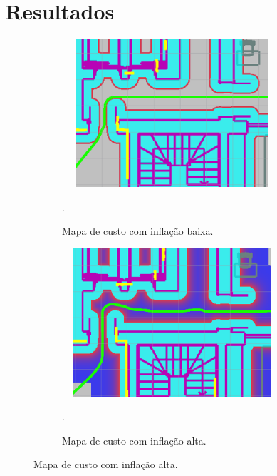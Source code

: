 \documentclass[repeatfields,xlists,xpacks,oneside,yearsonly]{ufrgscca}
\begin{document}
\chapter{Resultados}
\label{resultados}

\begin{figure}[h]
    \begin{subfigure}{0.5\linewidth}
    {
        \centering
        \caption{Mapa de custo com inflação baixa.}
        \label{fig:inflation_low}
        \includegraphics[width=0.9\textwidth, height=5.5cm]{costmap_not_inflated.png}\\
    }
    {.}
    \end{subfigure}
    \begin{subfigure}{0.5\linewidth}
    {
        \centering
        \caption{Mapa de custo com inflação alta.}
        \label{fig:inflation_high}
        \includegraphics[width=0.9\textwidth, height=5.5cm]{costmap_inflated.png}\\
    }
    {.}
    \end{subfigure}
\end{figure}
\end{document}
